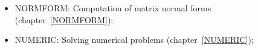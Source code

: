 \begin{itemize}
\item
{NORMFORM: Computation of matrix normal forms}
(chapter~\ref{NORMFORM}); 

\item
{NUMERIC: Solving numerical problems} (chapter~\ref{NUMERIC});


\end{itemize}
